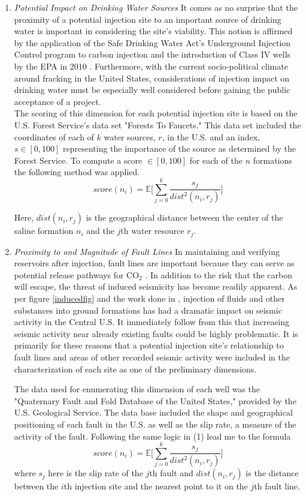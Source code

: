 \documentclass[letterpaper, 12pt]{article}
\begin{document}
\begin{enumerate}
\item \emph{Potential Impact on Drinking Water Sources} It comes as no surprise that the proximity of a potential injection site to an important source of drinking water is important in considering the site's viability.  This notion is affirmed by the application of the Safe Drinking Water Act's Underground Injection Control program to carbon injection and the introduction of Class IV wells by the EPA in 2010 \cite{natcarb_risk}. Furthermore, with the current socio-political climate around fracking in the United States, considerations of injection impact on drinking water must be especially well considered before gaining the public acceptance of a project. \\
The scoring of this dimension for each potential injection site is based on the U.S. Forest Service's data set "Forests To Faucets." This data set included the coordinates of each of $k$ water sources, $r$, in the U.S. and an index, $s \in [0, 100]$ representing the importance of the source as determined by the Forest Service. To compute a score $\in [0, 100]$ for each of the $n$ formations the following method was applied. 
$$score(n_i) =  \mathbb{E}\bigg[\sum_{j=0}^k \frac{s_j}{dist^2(n_i, r_j)}\bigg]$$

Here, $dist(n_i, r_j)$ is the geographical distance between the center of the saline formation $n_i$ and the $j$th water resource $r_j$. 

\item \emph{Proximity to and Magnitude of Fault Lines} In maintaining and verifying reservoirs after injection, fault lines are important because they can serve as potential release pathways for CO$_2$ \cite{natcarb_risk}. In addition to the risk that the carbon will escape, the threat of induced seismicity has become readily apparent. As per figure \ref{inducedfig} and the work done in \cite{seis_induced}, injection of fluids and other substances into ground formations has had a dramatic impact on seismic activity in the Central U.S. It immediately follow from this that increasing seismic activity near already existing faults could be highly problematic. It is primarily for these reasons that a potential injection site's relationship to fault lines and areas of other recorded seismic activity were included in the characterization of each site as one of the preliminary dimensions. 

The data used for enumerating this dimension of each well was the "Quaternary Fault and Fold Database of the United States," provided by the U.S. Geological Service. The data base included the shape and geographical positioning of each fault in the U.S. as well as the slip rate, a measure of the activity of the fault. Following the same logic in (1) lead me to the formula 
$$score(n_i) =  \mathbb{E}\bigg[\sum_{j=0}^k \frac{s_j}{dist^2(n_i, r_j)}\bigg]$$
where $s_j$ here is the slip rate of the $j$th fault and $dist(n_i, r_j)$ is the distance between the $i$th injection site and the nearest point to it on the $j$th fault line. 


\end{enumerate}
\end{document}
